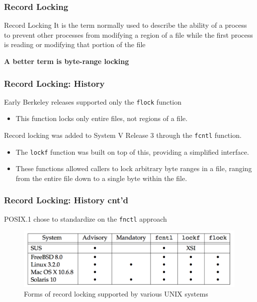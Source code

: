 \documentclass[newPxFont,sthlmFooter,nooffset]{beamer}
\begin{document}
\begin{frame}[t]
  \frametitle{Record Locking}

  \begin{block}{Record Locking}
   It is the term normally used to describe the ability of a process to prevent other processes from modifying a region of a file while the first process is reading or modifying that portion of the file
  \end{block}

\bigskip

\textbf{A better term is byte-range locking}
\end{frame}

\begin{frame}[t]
  \frametitle{Record Locking: History}
Early Berkeley releases supported only the \texttt{flock} function
\begin{itemize}
\item This function locks only entire files, not regions of a file.
\end{itemize}

Record locking was added to System V Release 3 through the \texttt{fcntl} function.
\begin{itemize}
\item The \texttt{lockf} function was built on top of this, providing a
  simplified interface.
\item These functions allowed callers to lock arbitrary byte ranges in a file, ranging from the entire file down to a single byte within the file.
\end{itemize}

\end{frame}

\begin{frame}[t]
  \frametitle{Record Locking: History cnt'd}
POSIX.1 chose to standardize on the \texttt{fnctl} approach

  \begin{figure}[h]
   \centering
    \includegraphics[width=0.8\linewidth]{figures/fig14_2-reclock.png}
    \caption{Forms of record locking supported by various \textsc{UNIX} systems}
  \end{figure}
\end{frame}
\end{document}
